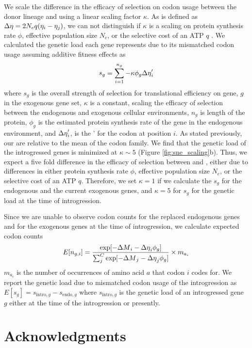 We scale the difference in the efficacy of selection on codon usage between the donor lineage and \kluyveri using a linear scaling factor $\kappa$.
As \DE is defined as ${\Delta \eta} = 2N_eq(\eta_i-\eta_j)$, we can not distinguish if $\kappa$ is a scaling on protein synthesis rate $\phi$, effective population size $N_e$, or the selective cost of an ATP $q$ \citep{gilchrist2007, gilchrist2015}.
We calculated the genetic load each gene represents due to its mismatched codon usage assuming additive fitness effects as 
\begin{equation}
s_g = \sum_{i=1}^{n_g} -\kappa \phi_g {\Delta \eta}'_i 
\end{equation}
where $s_g$ is the overall strength of selection for translational efficiency on gene, $g$  in the exogenous gene set, $\kappa$ is a constant, scaling the efficacy of selection between the endogenous and exogenous cellular environments, $n_{g}$ is length of the protein, $\phi_g$ is the estimated protein synthesis rate of the gene in the endogenous environment, and ${\Delta \eta}'_i$, is the \DE' for the codon at position $i$.
As stated previously, our \DE are relative to the mean of the codon family.
We find that the genetic load of the introgressed genes is minimized at $\kappa \sim 5$ (Figure \ref{fig:sne_scaling}b).
Thus, we expect a five fold difference in the efficacy of selection between \kluyveri and \gossypii, either due to differences in either protein synthesis rate $\phi$, effective population size $N_e$, or the selective cost of an ATP $q$.
Therefore, we set $\kappa = 1$ if we calculate the $s_g$ for the endogenous and the current exogenous genes, and $\kappa = 5$ for $s_g$ for the genetic load at the time of introgression.

Since we are unable to observe codon counts for the replaced endogenous genes and for the exogenous genes at the time of introgression, we calculate expected codon counts
\begin{equation}
E[n_{g,i}] = \frac{\exp[-{\Delta M}_i -{\Delta \eta}_i\phi_g]}{\sum_j^C \exp[-{\Delta M}_j -{\Delta \eta}_j\phi_g]}\times m_{a_i}
\end{equation} 
$m_{a_i}$ is the number of occurrences of amino acid $a$ that codon $i$ codes for.
We report the genetic load due to mismatched codon usage of the introgression as $E[s_g] = s_{\text{intro},g} - s_{\text{endo},g}$ where $s_{\text{intro},g}$ is the genetic load of an introgressed gene $g$ either at the time of the introgression or presently.

\section{Acknowledgments}

